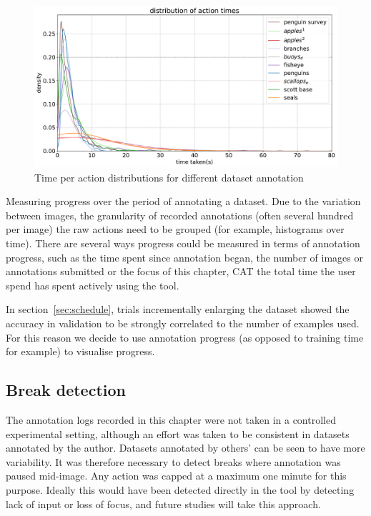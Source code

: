 \begin{figure}
\centering
  \includegraphics[width=1.0\linewidth]{charts/summaries/time_density.pdf}
  \caption{Time per action distributions for different dataset annotation}
  \label{fig:annotation_time_density}
\end{figure}

Measuring progress over the period of annotating a dataset. Due to the variation between images, the granularity of recorded annotations (often several hundred per image) the raw actions need to be grouped (for example, histograms over time). There are several ways progress could be measured in terms of annotation progress, such as the time spent since annotation began, the number of images or annotations submitted or the focus of this chapter, \gls{CAT} the total time the user spend has spent actively using the tool.

In section~\ref{sec:schedule}, trials incrementally enlarging the dataset showed the accuracy in validation to be strongly correlated to the number of examples used. For this reason we decide to use annotation progress (as opposed to training time for example) to visualise progress.

\subsection {Break detection}
\label{sec:break_detection}

The annotation logs recorded in this chapter were not taken in a controlled experimental setting, although an effort was taken to be consistent in datasets annotated by the author. Datasets annotated by others' can be seen to have more variability. It was therefore necessary to detect breaks where annotation was paused mid-image. Any action was capped at a maximum one minute for this purpose. Ideally this would have been detected directly in the tool by detecting lack of input or loss of focus, and future studies will take this approach. 

